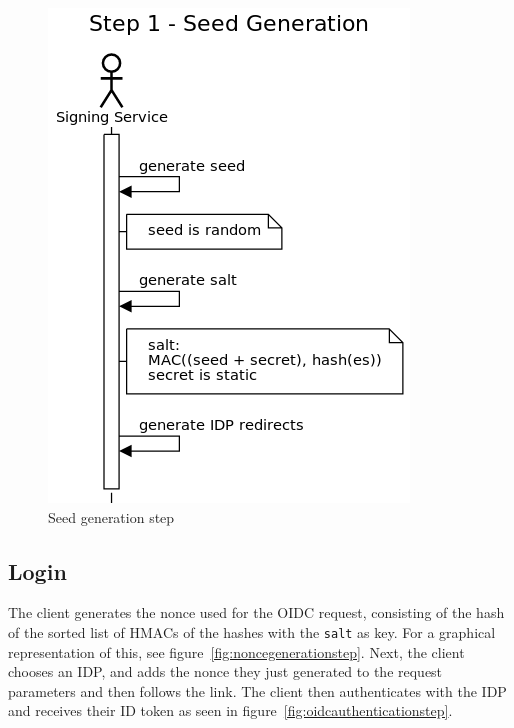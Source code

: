\begin{figure}
	\begin{center}
		\includegraphics[scale=0.5]{images/protocol_step1_seed_generation.png}
		\caption{Seed generation step}
		\label{fig:seedgenerationstep}
	\end{center}
\end{figure}

\subsection{Login}\label{subsec:login}
The client generates the nonce used for the \gls{OIDC} request,
consisting of the hash of the sorted list of \gls{HMAC}s of the hashes with the \texttt{salt} as key.
For a graphical representation of this, see figure~\ref{fig:noncegenerationstep}.
Next, the client chooses an \gls{IDP}, and adds the nonce they just generated to the request parameters and then follows the link.
The client then authenticates with the \gls{IDP} and receives their ID token as seen in figure~\ref{fig:oidcauthenticationstep}.


